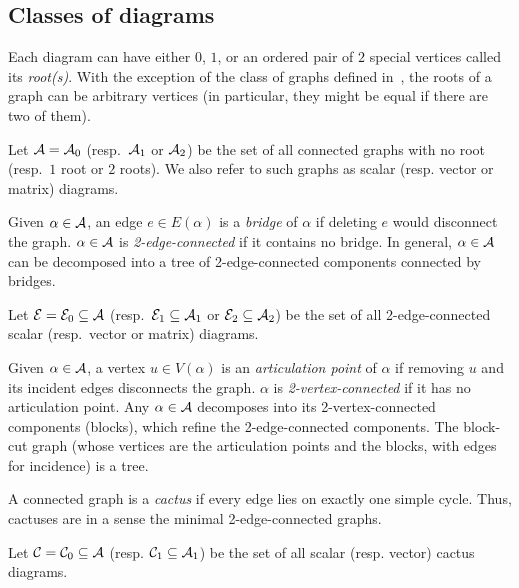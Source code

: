 \subsection{Classes of diagrams}

Each diagram can have either $0$, $1$, or an ordered pair of $2$ special vertices called its \emph{root(s)}. With the exception of the class of graphs defined in~, the roots of a graph can be arbitrary vertices (in particular, they might be equal if there are two of them).

\begin{notation}
    Let ${\cal A}={\cal A}_0$ (resp.\ ${\cal A}_1$ or ${\cal A}_2$) be the set of all connected graphs with no 
    root (resp.\ $1$ root or $2$ roots). We also
    refer to such graphs as scalar (resp. vector or matrix) diagrams.
\end{notation}

Given $\alpha\in{\cal A}$, an edge
$e\in E(\alpha)$ is a {\em bridge} of $\alpha$ if deleting $e$
would disconnect the graph. $\alpha\in{\cal A}$ is {\em 2-edge-connected} if it contains no bridge. In general, $\alpha\in{\cal A}$ can be decomposed into 
a tree of 2-edge-connected components connected by
bridges.

\begin{notation}
    Let ${\cal E}={\cal E}_0\subseteq{\cal A}$ (resp.\ ${\cal E}_1\subseteq {\cal A}_1$ or ${\cal E}_2\subseteq {\cal A}_2$) be the set of all 2-edge-connected
    scalar  (resp.\ vector or matrix) diagrams.
\end{notation}

Given $\alpha\in{\cal A}$, a vertex $u\in V(\alpha)$ 
is an {\em articulation point} of $\alpha$ if removing $u$ and its incident edges
disconnects the graph. 
$\alpha$ is 
{\em 2-vertex-connected} if it has no articulation point.
Any $\alpha\in{\cal A}$ decomposes into its 2-vertex-connected components
(blocks), which refine the 2-edge-connected components. The block-cut
graph (whose vertices are the articulation points and the blocks, with edges for
incidence) is a tree.

A connected graph is a {\em cactus} if every edge
lies on exactly one simple cycle.
Thus, cactuses are in a sense the minimal 2-edge-connected graphs.

\begin{notation}
    Let ${\cal C}={\cal C}_0\subseteq {\cal A}$ (resp. ${\cal C}_1\subseteq {\cal A}_1$) be
    the set of all scalar (resp. vector) cactus diagrams.
\end{notation}

